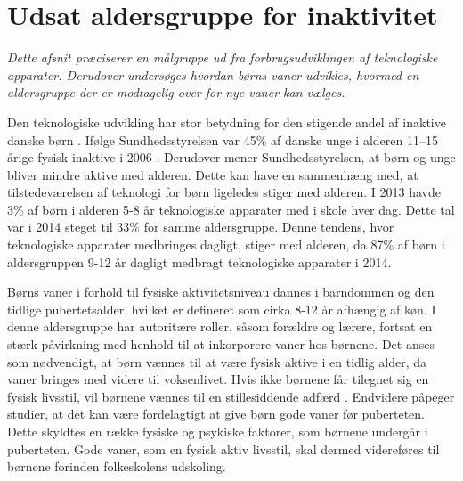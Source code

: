 \section{Udsat aldersgruppe for inaktivitet} \label{sec:maalgruppe}
\textit{Dette afsnit præciserer en målgruppe ud fra forbrugsudviklingen af teknologiske apparater. Derudover undersøges hvordan børns vaner udvikles, hvormed en aldersgruppe der er modtagelig over for nye vaner kan vælges.}

Den teknologiske udvikling har stor betydning for den stigende andel af inaktive danske børn %
\citep{Kiens2007}. Ifølge Sundhedsstyrelsen var 45\% af danske unge i alderen 11–15 årige fysisk inaktive i 2006 \citep{Sundhedsstyrelsen2006}. Derudover mener Sundhedsstyrelsen, at børn og unge bliver mindre aktive med alderen. Dette kan have en sammenhæng med, at tilstedeværelsen af teknologi for børn ligeledes stiger med alderen. %
I 2013 havde 3\% af børn i alderen 5-8 år teknologiske apparater med i skole hver dag. Dette tal var i 2014 steget til 33\% for samme aldersgruppe. Denne tendens, hvor teknologiske apparater medbringes dagligt, stiger med alderen, da 87\% af børn i aldersgruppen 9-12 år dagligt medbragt teknologiske apparater i 2014. \citep{Sundhedsstyrelsen2006,GjensidigeForsikring2014} 

Børns vaner i forhold til fysiske aktivitetsniveau dannes i barndommen og den tidlige pubertetsalder, hvilket er defineret som cirka 8-12 år afhængig af køn. I denne aldersgruppe har autoritære roller, såsom forældre og lærere, fortsat en stærk påvirkning med henhold til at inkorporere vaner hos børnene. \citep{F.SallisG.Simons-MortonJ.Stone1992,Wied2011,L.MeyerP.Gullotta2012} \newline
Det anses som nødvendigt, at børn vænnes til at være fysisk aktive i en tidlig alder, da vaner bringes med videre til voksenlivet. Hvis ikke børnene får tilegnet sig en fysisk livsstil, vil børnene vænnes til en stillesiddende adfærd \citep{L.MeyerP.Gullotta2012,Nabe-NielsenSundhedsministerietetal.2005,P.J.KremersBrug2008}. Endvidere påpeger studier, at det kan være fordelagtigt at give børn gode vaner før puberteten. Dette skyldtes en række fysiske og psykiske faktorer, som børnene undergår i puberteten. Gode vaner, som en fysisk aktiv livsstil, skal dermed videreføres til børnene forinden folkeskolens udskoling. \citep{L.MeyerP.Gullotta2012,F.SallisG.Simons-MortonJ.Stone1992,P.J.KremersBrug2008}

